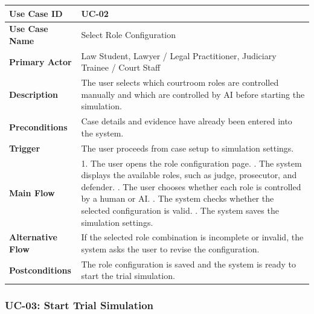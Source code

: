 \begin{longtable}{|p{4cm}|p{10cm}|}
\hline
\textbf{Use Case ID} & UC-02 \\ \hline
\textbf{Use Case Name} & Select Role Configuration \\ \hline
\textbf{Primary Actor} & Law Student, Lawyer / Legal Practitioner, Judiciary Trainee / Court Staff \\ \hline
\textbf{Description} & The user selects which courtroom roles are controlled manually and which are controlled by AI before starting the simulation. \\ \hline
\textbf{Preconditions} & Case details and evidence have already been entered into the system. \\ \hline
\textbf{Trigger} & The user proceeds from case setup to simulation settings. \\ \hline
\textbf{Main Flow} & 
1. The user opens the role configuration page. \newline
2. The system displays the available roles, such as judge, prosecutor, and defender. \newline
3. The user chooses whether each role is controlled by a human or AI. \newline
4. The system checks whether the selected configuration is valid. \newline
5. The system saves the simulation settings. \\ \hline
\textbf{Alternative Flow} & 
If the selected role combination is incomplete or invalid, the system asks the user to revise the configuration. \\ \hline
\textbf{Postconditions} & 
The role configuration is saved and the system is ready to start the trial simulation. \\ \hline
\end{longtable}

\subsubsection{UC-03: Start Trial Simulation}

